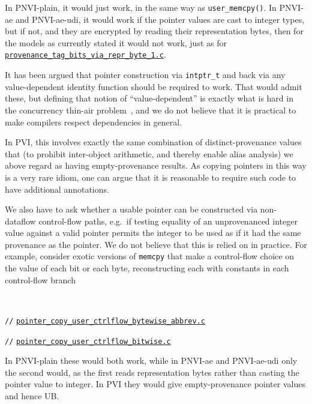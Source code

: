 \documentclass[acmsmall,review,screen]{acmart}\settopmatter{printfolios=true,printccs=false,printacmref=false}
\newcommand{\myparagraph}[1]{\vspace{0.5\baselineskip}\par\noindent{\normalsize\bfseries{#1}}\quad}
\newcommand{\mytesturl}[1]{https://cerberus.cl.cam.ac.uk/cerberus?defacto/#1}
\newcommand{\mytestlink}[2]{\href{\mytesturl{#1}}{#2}}
\newcommand{\mylsttestlink}[1]{\mytestlink{#1}{\lstinline{#1}}}
\newcommand{\mylistingmargin}{5mm}
\newcommand{\myfooexamplename}[1]{\mylsttestlink{#1}}
\newcommand{\myfooexample}[3]{{\vspace*{-0.5\baselineskip}\par{\noindent\small\hspace*{\mylistingmargin}\lstinline{//} \mylsttestlink{#2}\vspace*{0.25\baselineskip}\par}}}
\begin{document}
In PNVI-plain, it would just work, in the same way as \lstinline{user_memcpy()}.
In PNVI-ae and PNVI-ae-udi, it would work if the pointer values are
cast to integer types, but if not, and they are encrypted by reading
their representation bytes, then for the models as currently stated it
would not work, just as for
\myfooexamplename{provenance_tag_bits_via_repr_byte_1.c}. 

It has been argued that pointer construction via \lstinline{intptr_t} and back via any
value-dependent identity function should be required to work.  That
would admit these, but defining that notion of ``value-dependent'' is
exactly what is hard in the concurrency thin-air problem~\cite{BMNPS2015},
and we do not believe that it is practical to make compilers respect dependencies in general.

In PVI, this involves exactly the same combination of distinct-provenance
values that (to prohibit inter-object arithmetic, and thereby enable
alias analysis) we above regard as having empty-provenance results.  
As copying pointers in this way  is a very rare idiom, one can argue
that  it is reasonable to require such
code to have additional annotations.

\newpage

\myparagraph{Copying pointer values via control flow} 
We
also have to ask whether a usable pointer can be constructed via
non-dataflow control-flow paths, e.g.~if testing
equality of an unprovenanced integer value against a valid pointer
permits the integer to be used as if it had the same provenance as the
pointer.  We do not believe that this is relied on in practice.
 For example, consider
exotic versions of
\lstinline{memcpy}
that make a control-flow choice on the
value of each bit or each byte, reconstructing each with constants in
each control-flow branch

\

\begin{center}
  \begin{minipage}[t]{0.49\textwidth}
{\renewcommand{\mylistingmargin}{0mm}\myfooexample{charon_tests}{pointer_copy_user_ctrlflow_bytewise_abbrev.c}{}%
}
\vspace*{-0\baselineskip}
\end{minipage}
  \begin{minipage}[t]{0.49\textwidth}
    {\renewcommand{\mylistingmargin}{0mm}\myfooexample{charon_tests}{pointer_copy_user_ctrlflow_bitwise.c}{}%
}
  \end{minipage}
  \end{center}
In PNVI-plain these would both work, while in PNVI-ae and PNVI-ae-udi
only the second would, as the first reads representation bytes rather
than casting the pointer value to integer. In PVI they would give
empty-provenance pointer values and hence UB.
\end{document}

